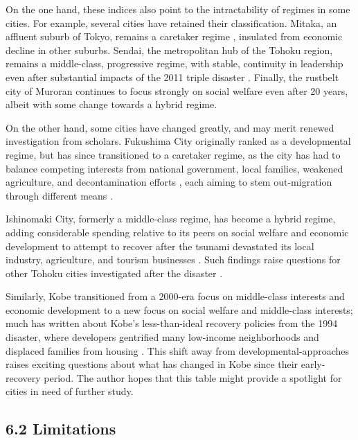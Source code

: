 \documentclass[preprint, 3p,
authoryear]{elsarticle} %
\begin{document}
On the one hand, these indices also point to the intractability of
regimes in some cities. For example, several cities have retained their
classification. Mitaka, an affluent suburb of Tokyo, remains a caretaker
regime
\citep{steiner_1957, fukuchi_and_yamaguchi_1997, ohashi_and_phelps_2021},
insulated from economic decline in other suburbs. Sendai, the
metropolitan hub of the Tohoku region, remains a middle-class,
progressive regime, with stable, continuity in leadership even after
substantial impacts of the 2011 triple disaster
\citep{morris_2012, tsuji_2017}. Finally, the rustbelt city of Muroran
\citep{edgington_2013} continues to focus strongly on social welfare
even after 20 years, albeit with some change towards a hybrid regime.

On the other hand, some cities have changed greatly, and may merit
renewed investigation from scholars. Fukushima City originally ranked as
a developmental regime, but has since transitioned to a caretaker
regime, as the city has had to balance competing interests from national
government, local families, weakened agriculture, and decontamination
efforts \citep{otsuki_2016, abeysinghe_2022}, each aiming to stem
out-migration through different means \citep{zhang_2014}.

Ishinomaki City, formerly a middle-class regime, has become a hybrid
regime, adding considerable spending relative to its peers on social
welfare and economic development to attempt to recover after the tsunami
devastated its local industry, agriculture, and tourism businesses
\citep{dimmer_and_lindenberg_2014, matthews_2017, ji_and_imai_2022}.
Such findings raise questions for other Tohoku cities investigated after
the disaster \citep{aldrich_2019, cheek_2020}.

Similarly, Kobe transitioned from a 2000-era focus on middle-class
interests and economic development \citep{nunokawa_2007, funck_2007} to
a new focus on social welfare and middle-class interests; much has
written about Kobe's less-than-ideal recovery policies from the 1994
disaster, where developers gentrified many low-income neighborhoods and
displaced families from housing
\citep{yasui_2007, edgington_2010, aldrich_2012, maly_2012}. This shift
away from developmental-approaches raises exciting questions about what
has changed in Kobe since their early-recovery period. The author hopes
that this table might provide a spotlight for cities in need of further
study.

\hypertarget{limitations}{%
\subsection{6.2 Limitations}\label{limitations}}
\end{document}
